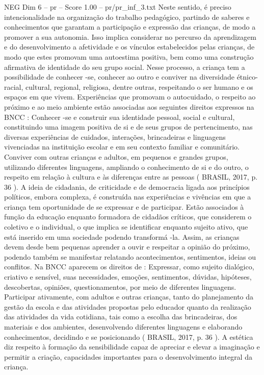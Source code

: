 \begin{textsample}{NEG Dim 6 – pr – Score 1.00 – pr/pr\_inf\_3.txt}
Neste sentido, é preciso intencionalidade na organização do trabalho pedagógico, partindo de saberes e conhecimentos que garantam a participação e expressão das crianças, de modo a promover a sua autonomia.
Isso implica considerar no percurso da aprendizagem e do desenvolvimento a afetividade e os vínculos estabelecidos pelas crianças, de modo que estes promovam uma autoestima positiva, bem como uma construção afirmativa de identidade do seu grupo social.
Nesse processo, a criança tem a possibilidade de conhecer -se, conhecer ao outro e conviver na diversidade étnico-racial, cultural, regional, religiosa, dentre outras, respeitando o ser humano e os espaços em que vivem.
Experiências que promovam o autocuidado, o respeito ao próximo e ao meio ambiente estão associadas aos seguintes direitos expressos na BNCC : Conhecer -se e construir sua identidade pessoal, social e cultural, constituindo uma imagem positiva de si e de seus grupos de pertencimento, nas diversas experiências de cuidados, interações, brincadeiras e linguagens vivenciadas na instituição escolar e em seu contexto familiar e comunitário.
Conviver com outras crianças e adultos, em pequenos e grandes grupos, utilizando diferentes linguagens, ampliando o conhecimento de si e do outro, o respeito em relação à cultura e às diferenças entre as pessoas ( BRASIL, 2017, p. 36 ).
A ideia de cidadania, de criticidade e de democracia ligada aos princípios políticos, embora complexa, é construída nas experiências e vivências em que a criança tem oportunidade de se expressar e de participar.
Estão associados à função da educação enquanto formadora de cidadãos críticos, que considerem o coletivo e o individual, o que implica se identificar enquanto sujeito ativo, que está inserido em uma sociedade podendo transformá -la.
Assim, as crianças devem desde bem pequenas aprender a ouvir e respeitar a opinião do próximo, podendo também se manifestar relatando acontecimentos, sentimentos, ideias ou conflitos.
Na BNCC aparecem os direitos de : Expressar, como sujeito dialógico, criativo e sensível, suas necessidades, emoções, sentimentos, dúvidas, hipóteses, descobertas, opiniões, questionamentos, por meio de diferentes linguagens.
Participar ativamente, com adultos e outras crianças, tanto do planejamento da gestão da escola e das atividades propostas pelo educador quanto da realização das atividades da vida cotidiana, tais como a escolha das brincadeiras, dos materiais e dos ambientes, desenvolvendo diferentes linguagens e elaborando conhecimentos, decidindo e se posicionando ( BRASIL, 2017, p. 36 ).
A estética diz respeito à formação da sensibilidade capaz de apreciar e elevar a imaginação e permitir a criação, capacidades importantes para o desenvolvimento integral da criança.

\end{textsample}

